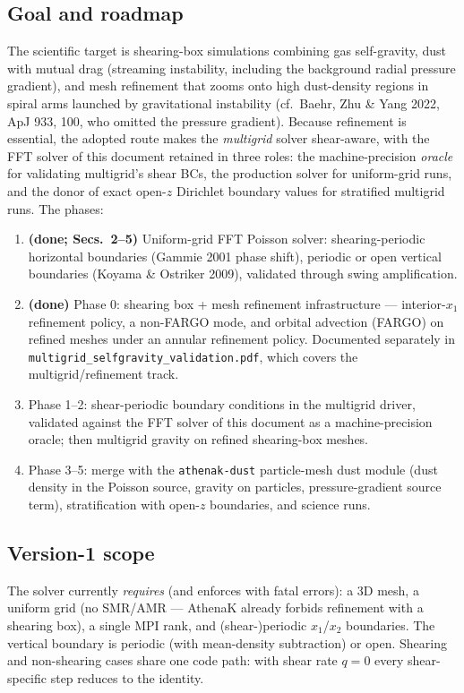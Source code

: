 \documentclass[11pt]{article}
\newcommand{\code}[1]{\texttt{#1}}
\begin{document}
\subsection{Goal and roadmap}
The scientific target is shearing-box simulations combining gas self-gravity, dust with
mutual drag (streaming instability, including the background radial pressure gradient),
and mesh refinement that zooms onto high dust-density regions in spiral arms launched by
gravitational instability (cf.\ Baehr, Zhu \& Yang 2022, ApJ 933, 100, who omitted the
pressure gradient). Because refinement is essential, the adopted route makes the
\emph{multigrid} solver shear-aware, with the FFT solver of this document retained in
three roles: the machine-precision \emph{oracle} for validating multigrid's shear BCs,
the production solver for uniform-grid runs, and the donor of exact open-$z$ Dirichlet
boundary values for stratified multigrid runs. The phases:
\begin{enumerate}
  \item \textbf{(done; Secs.~2--5)} Uniform-grid FFT Poisson solver: shearing-periodic
        horizontal boundaries (Gammie 2001 phase shift), periodic or open vertical
        boundaries (Koyama \& Ostriker 2009), validated through swing amplification.
  \item \textbf{(done)} Phase 0: shearing box + mesh refinement infrastructure ---
        interior-$x_1$ refinement policy, a non-FARGO mode, and orbital advection
        (FARGO) on refined meshes under an annular refinement policy. Documented
        separately in \code{multigrid\_selfgravity\_validation.pdf}, which covers the
        multigrid/refinement track.
  \item Phase 1--2: shear-periodic boundary conditions in the multigrid driver,
        validated against the FFT solver of this document as a machine-precision
        oracle; then multigrid gravity on refined shearing-box meshes.
  \item Phase 3--5: merge with the \code{athenak-dust} particle-mesh dust module
        (dust density in the Poisson source, gravity on particles, pressure-gradient
        source term), stratification with open-$z$ boundaries, and science runs.
\end{enumerate}

\subsection{Version-1 scope}
The solver currently \emph{requires} (and enforces with fatal errors): a 3D mesh, a
uniform grid (no SMR/AMR --- AthenaK already forbids refinement with a shearing box),
a single MPI rank, and (shear-)periodic $x_1$/$x_2$ boundaries. The vertical boundary
is periodic (with mean-density subtraction) or open. Shearing and non-shearing cases
share one code path: with shear rate $q=0$ every shear-specific step reduces to the
identity.
\end{document}
